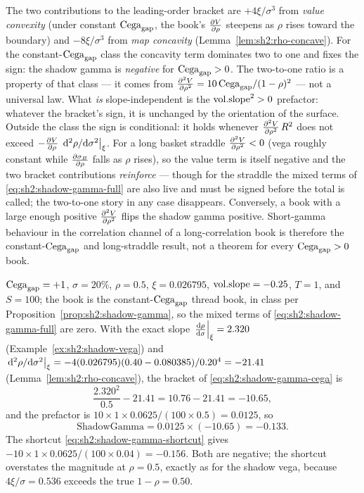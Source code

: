 \begin{remark}
\label{rem:sh2:gamma-sign}
The two contributions to the leading-order bracket are $+4\xi/\sigma^3$
from \emph{value convexity} (under constant $\mathrm{Cega}_{\mathrm{gap}}$, the book's
$\frac{\partial V}{\partial \rho}$ steepens as $\rho$ rises toward the boundary) and
$-8\xi/\sigma^3$ from \emph{map concavity}
(Lemma~\ref{lem:sh2:rho-concave}). For the constant-$\mathrm{Cega}_{\mathrm{gap}}$ class the
concavity term dominates two to one and fixes the sign: the shadow gamma
is \emph{negative} for $\mathrm{Cega}_{\mathrm{gap}} > 0$. The two-to-one ratio is a property
of that class --- it comes from
$\frac{\partial^2 V}{\partial \rho^2} = 10\,\mathrm{Cega}_{\mathrm{gap}}/(1-\rho)^2$ --- not a universal law. What
\emph{is} slope-independent is the $\mathrm{vol.slope}^2 > 0$ prefactor: whatever
the bracket's sign, it is unchanged by the orientation of the surface.
Outside the class the sign is conditional: it holds whenever
$\frac{\partial^2 V}{\partial \rho^2}\,R^2$ does not exceed
$-\frac{\partial V}{\partial \rho}\,\left.\mathrm{d}^2\rho/\mathrm{d}\sigma^2\right|_{\xi}$. For a long basket
straddle $\frac{\partial^2 V}{\partial \rho^2} < 0$ (vega roughly constant while
$\frac{\partial \sigma_B}{\partial \rho}$ falls as $\rho$ rises), so the value term is itself
negative and the two bracket contributions \emph{reinforce} --- though
for the straddle the mixed terms of \eqref{eq:sh2:shadow-gamma-full} are
also live and must be signed before the total is called; the two-to-one
story in any case disappears. Conversely, a book with
a large enough positive $\frac{\partial^2 V}{\partial \rho^2}$ flips the shadow gamma positive.
Short-gamma behaviour in the correlation channel of a long-correlation
book is therefore the constant-$\mathrm{Cega}_{\mathrm{gap}}$ and long-straddle result, not a
theorem for every $\mathrm{Cega}_{\mathrm{gap}} > 0$ book.
\end{remark}

\begin{example}\label{ex:sh2:shadow-gamma}
$\mathrm{Cega}_{\mathrm{gap}} = +1$, $\sigma = 20\%$, $\rho = 0.5$, $\xi = 0.026795$,
$\mathrm{vol.slope} = -0.25$, $T = 1$, and $S = 100$; the book is the
constant-$\mathrm{Cega}_{\mathrm{gap}}$ thread book, in class per
Proposition~\ref{prop:sh2:shadow-gamma}, so the mixed terms of
\eqref{eq:sh2:shadow-gamma-full} are zero. With the exact slope
$\left.\frac{\mathrm{d} \rho}{\mathrm{d} \sigma}\right|_{\xi} = 2.320$
(Example~\ref{ex:sh2:shadow-vega}) and
$\left.\mathrm{d}^2\rho/\mathrm{d}\sigma^2\right|_{\xi}
= -4(0.026795)(0.40 - 0.080385)/0.20^4 = -21.41$
(Lemma~\ref{lem:sh2:rho-concave}), the bracket of
\eqref{eq:sh2:shadow-gamma-cega} is
\[
  \frac{2.320^2}{0.5} - 21.41 = 10.76 - 21.41 = -10.65,
\]
and the prefactor is
$10 \times 1 \times 0.0625 / (100 \times 0.5) = 0.0125$, so
\[
  \mathrm{ShadowGamma} = 0.0125 \times (-10.65) = -0.133 .
\]
The shortcut \eqref{eq:sh2:shadow-gamma-shortcut} gives
$-10 \times 1 \times 0.0625/(100 \times 0.04) = -0.156$. Both are negative;
the shortcut overstates the magnitude at $\rho = 0.5$, exactly as for the
shadow vega, because $4\xi/\sigma = 0.536$ exceeds the true
$1 - \rho = 0.50$.
\end{example}

